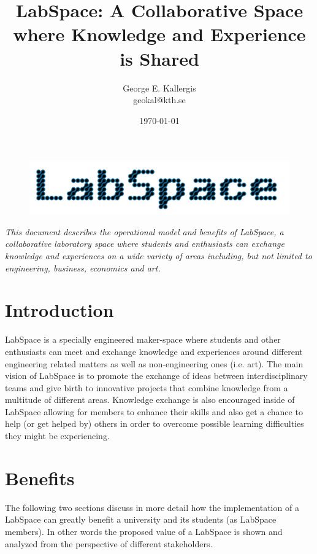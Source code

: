 \documentclass[a4paper, 11pt]{article}
\title{LabSpace: A Collaborative Space where Knowledge and Experience is Shared}
\author{George E. Kallergis\\geokal@kth.se}
\date{\today{}}
\begin{document}
\maketitle

\begin{figure}[h!]
  \begin{center}
    \includegraphics[width=\textwidth,height=\textheight,keepaspectratio]{imagery/logo.png}
    \label{fig:dneaf}
  \end{center}
\end{figure}

\textit{This document describes the operational model and benefits of LabSpace, a collaborative laboratory space where students and enthusiasts can exchange knowledge and experiences on a wide variety of areas including, but not limited to engineering, business, economics and art.}

\newpage

\section*{Introduction}
LabSpace is a specially engineered maker-space where students and other enthusiasts can meet and exchange knowledge and experiences around different engineering related matters as well as non-engineering ones (i.e. art). The main vision of LabSpace is to promote the exchange of ideas between interdisciplinary teams and give birth to innovative projects that combine knowledge from a multitude of different areas. Knowledge exchange is also encouraged inside of LabSpace allowing for members to enhance their skills and also get a chance to help (or get helped by) others in order to overcome possible learning difficulties they might be experiencing.

\section{Benefits}
The following two sections discuss in more detail how the implementation of a LabSpace can greatly benefit a university and its students (as LabSpace members). In other words the proposed value of a LabSpace is shown and analyzed from the perspective of different stakeholders.
\end{document}
